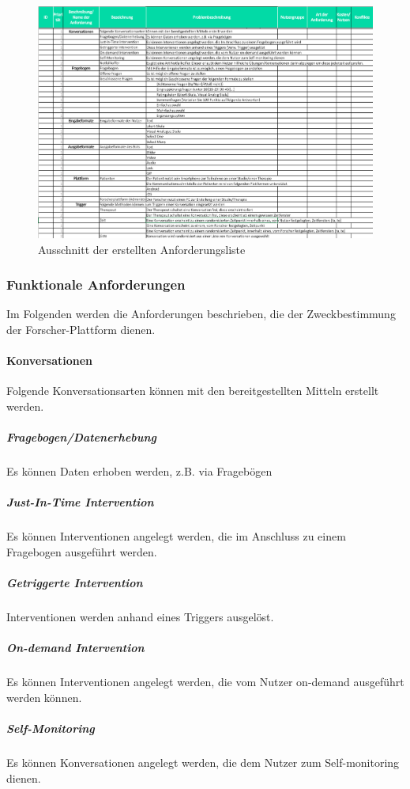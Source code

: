 \begin{figure}[h]
\centering
\includegraphics[width=1\textwidth]{pictures/anforderungen}
\caption{Ausschnitt der erstellten Anforderungsliste}
\label{anforderungen}
\end{figure}

\subsubsection{Funktionale Anforderungen}
Im Folgenden werden die Anforderungen beschrieben, die der Zweckbestimmung der Forscher-Plattform dienen.

\paragraph{Konversationen}
Folgende Konversationsarten können mit den bereitgestellten Mitteln erstellt werden.

\subparagraph{Fragebogen/Datenerhebung} Es können Daten erhoben werden, z.B. via Fragebögen
\subparagraph{Just-In-Time Intervention} Es können Interventionen angelegt werden, die im Anschluss zu einem Fragebogen ausgeführt werden.
\subparagraph{Getriggerte Intervention} Interventionen werden anhand eines Triggers  ausgelöst.
\subparagraph{On-demand Intervention} Es können Interventionen angelegt werden, die vom Nutzer on-demand ausgeführt werden können.
\subparagraph{Self-Monitoring} Es können Konversationen angelegt werden, die dem Nutzer zum Self-monitoring dienen.

